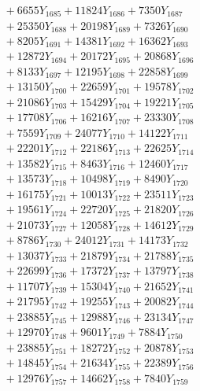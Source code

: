 \documentclass[a4paper,10pt]{article}
\begin{document}
{\begin{align}
&\;  + 6655 Y_{1685} + 11824 Y_{1686} + 7350 Y_{1687} \\[0.3ex]
&\;  + 25350 Y_{1688} + 20198 Y_{1689} + 7326 Y_{1690} \\[0.3ex]
&\;  + 8205 Y_{1691} + 14381 Y_{1692} + 16362 Y_{1693} \\[0.3ex]
&\;  + 12872 Y_{1694} + 20172 Y_{1695} + 20868 Y_{1696} \\[0.3ex]
&\;  + 8133 Y_{1697} + 12195 Y_{1698} + 22858 Y_{1699} \\[0.3ex]
&\;  + 13150 Y_{1700} + 22659 Y_{1701} + 19578 Y_{1702} \\[0.3ex]
&\;  + 21086 Y_{1703} + 15429 Y_{1704} + 19221 Y_{1705} \\[0.3ex]
&\;  + 17708 Y_{1706} + 16216 Y_{1707} + 23330 Y_{1708} \\[0.5ex]\allowbreak
&\;  + 7559 Y_{1709} + 24077 Y_{1710} + 14122 Y_{1711} \\[0.3ex]
&\;  + 22201 Y_{1712} + 22186 Y_{1713} + 22625 Y_{1714} \\[0.3ex]
&\;  + 13582 Y_{1715} + 8463 Y_{1716} + 12460 Y_{1717} \\[0.3ex]
&\;  + 13573 Y_{1718} + 10498 Y_{1719} + 8490 Y_{1720} \\[0.3ex]
&\;  + 16175 Y_{1721} + 10013 Y_{1722} + 23511 Y_{1723} \\[0.3ex]
&\;  + 19561 Y_{1724} + 22720 Y_{1725} + 21820 Y_{1726} \\[0.3ex]
&\;  + 21073 Y_{1727} + 12058 Y_{1728} + 14612 Y_{1729} \\[0.3ex]
&\;  + 8786 Y_{1730} + 24012 Y_{1731} + 14173 Y_{1732} \\[0.3ex]
&\;  + 13037 Y_{1733} + 21879 Y_{1734} + 21788 Y_{1735} \\[0.3ex]
&\;  + 22699 Y_{1736} + 17372 Y_{1737} + 13797 Y_{1738} \\[0.5ex]\allowbreak
&\;  + 11707 Y_{1739} + 15304 Y_{1740} + 21652 Y_{1741} \\[0.3ex]
&\;  + 21795 Y_{1742} + 19255 Y_{1743} + 20082 Y_{1744} \\[0.3ex]
&\;  + 23885 Y_{1745} + 12988 Y_{1746} + 23134 Y_{1747} \\[0.3ex]
&\;  + 12970 Y_{1748} + 9601 Y_{1749} + 7884 Y_{1750} \\[0.3ex]
&\;  + 23885 Y_{1751} + 18272 Y_{1752} + 20878 Y_{1753} \\[0.3ex]
&\;  + 14845 Y_{1754} + 21634 Y_{1755} + 22389 Y_{1756} \\[0.3ex]
&\;  + 12976 Y_{1757} + 14662 Y_{1758} + 7840 Y_{1759} \\[0.3ex]

\end{align}}
\end{document}
